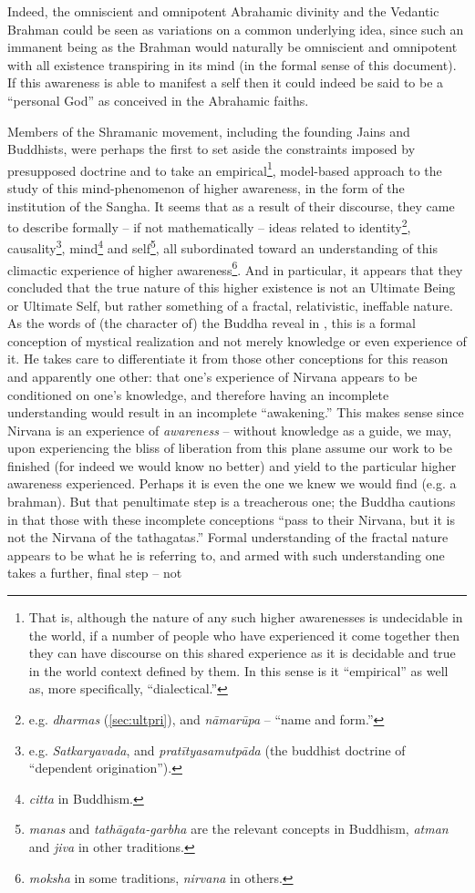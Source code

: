 \documentclass[pra,twocolumn,groupedaddress,10pt]{revtex4}
\theoremstyle{definition}
\begin{document}
Indeed, the omniscient and omnipotent Abrahamic divinity and the Vedantic Brahman could be seen as variations on a common underlying idea, since such an immanent being as the Brahman would naturally be omniscient and omnipotent with all existence transpiring in its mind (in the formal sense of this document). If this awareness is able to manifest a self then it could indeed be said to be a ``personal God'' as conceived in the Abrahamic faiths.

Members of the Shramanic movement, including the founding Jains and Buddhists, were perhaps the first to set aside the constraints imposed by presupposed doctrine and to take an empirical\footnote{That is, although the nature of any such higher awarenesses is undecidable in the world, if a number of people who have experienced it come together then they can have discourse on this shared experience as it is decidable and true in the world context defined by them. In this sense is it ``empirical'' as well as, more specifically, ``dialectical.''}, model-based approach to the study of this mind-phenomenon of higher awareness, in the form of the institution of the Sangha. It seems that as a result of their discourse, they came to describe formally -- if not mathematically -- ideas related to identity\footnote{e.g. \textit{dharmas} (\autoref{sec:ultpri}), and \textit{n\={a}mar\={u}pa} -- ``name and form.''}, causality\footnote{e.g. \textit{Satkaryavada}, and \textit{prat\={i}tyasamutp\={a}da} (the buddhist doctrine of ``dependent origination'').}, mind\footnote{\textit{citta} in Buddhism.} and self\footnote{\textit{manas} and \textit{tath\={a}gata-garbha} are the relevant concepts in Buddhism, \textit{atman} and \textit{jiva} in other traditions.}, all subordinated toward an understanding of this climactic experience of higher awareness\footnote{\textit{moksha} in some traditions, \textit{nirvana} in others.}. And in particular, it appears that they concluded that the true nature of this higher existence is not an Ultimate Being or Ultimate Self, but rather something of a fractal, relativistic, ineffable nature. As the words of (the character of) the Buddha reveal in \cite{lankavatara}, this is a formal conception of mystical realization and not merely knowledge or even experience of it. He takes care to differentiate it from those other conceptions for this reason and apparently one other: that one's experience of Nirvana appears to be conditioned on one's knowledge, and therefore having an incomplete understanding would result in an incomplete ``awakening.'' This makes sense since Nirvana is an experience of \textit{awareness} -- without knowledge as a guide, we may, upon experiencing the bliss of liberation from this plane assume our work to be finished (for indeed we would know no better) and yield to the particular higher awareness experienced. Perhaps it is even the one we knew we would find (e.g. a brahman). But that penultimate step is a treacherous one; the Buddha cautions in \cite{lankavatara} that those with these incomplete conceptions ``pass to their Nirvana, but it is not the Nirvana of the tathagatas.'' Formal understanding of the fractal nature appears to be what he is referring to, and armed with such understanding one takes a further, final step -- not 
\end{document}
